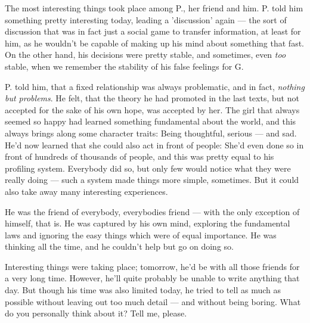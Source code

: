 The most interesting things took place among P., her friend and him. P. told him something pretty interesting today, leading a 'discussion' again --- the sort of discussion that was in fact just a social game to transfer information, at least for him, as he wouldn't be capable of making up his mind about something that fast. On the other hand, his decisions were pretty stable, and sometimes, even \emph{too} stable, when we remember the stability of his false feelings for G.

P. told him, that a fixed relationship was always problematic, and in fact, \emph{nothing but problems}. He felt, that the theory he had promoted in the last texts, but not accepted for the sake of his own hope, was accepted by her. The girl that always seemed so happy had learned something fundamental about the world, and this always brings along some character traits: Being thoughtful, serious --- and sad. He'd now learned that she could also act in front of people: She'd even done so in front of hundreds of thousands of people, and this was pretty equal to his profiling system. Everybody did so, but only few would notice what they were really doing --- such a system made things more simple, sometimes. But it could also take away many interesting experiences.

He was the friend of everybody, everybodies friend --- with the only exception of himself, that is. 
He was captured by his own mind, exploring the fundamental laws and ignoring the easy things which were of equal importance. 
He was thinking all the time, and he couldn't help but go on doing so.

Interesting things were taking place; tomorrow, he'd be with all those friends for a very long time. However, he'll quite probably be unable to write anything that day. 
But though his time was also limited today, he tried to tell as much as possible without leaving out too much detail --- and without being boring. 
What do you personally think about it? Tell me, please.

